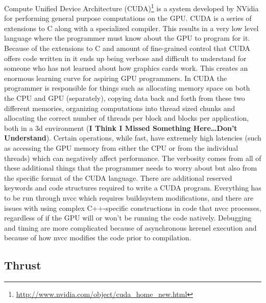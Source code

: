 \documentclass[twocolumn]{article}
\renewcommand{\|}{\origbar} %
\begin{document}
Compute Unified Device Architecture (CUDA)\footnote{\url{http://www.nvidia.com/object/cuda_home_new.html}} is a system developed by NVidia for performing general purpose computations on the GPU. CUDA is a series of extensions to C along with a specialized compiler. This results in a very low level language where the programmer must know about the GPU to program for it. Because of the extensions to C and amount of fine-grained control that CUDA offers code written in it ends up being verbose and difficult to understand for someone who has not learned about how graphics cards work. This creates an enormous learning curve for aspiring GPU programmers. In CUDA the programmer is responsible for things such as allocating memory space on both the CPU and GPU (separately), copying data back and forth from these two different memories, organizing computations into thread sized chunks and allocating the correct number of threads per block and blocks per application, both in a 3d environment ({\bf I Think I Missed Something Here\dots Don't Understand}). Certain operations, while fast, have extremely high latencies (such as accessing the GPU memory from either the CPU or from the individual threads) which can negatively affect performance. The verbosity comes from all of these additional things that the programmer needs to worry about but also from the specific format of the CUDA language. There are additional reserved keywords and code structures required to write a CUDA program. Everything has to be run through nvcc which requires buildsystem modifications, and there are issues with using complex C++-specific constructions in code that nvcc processes, regardless of if the GPU will or won't be running the code natively. Debugging and timing are more complicated because of asynchronous kerenel execution and because of how nvcc modifies the code prior to compilation.

\subsection{Thrust}
\end{document}
